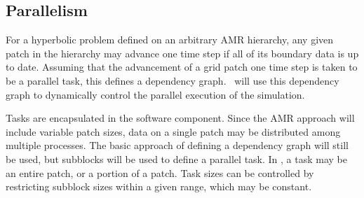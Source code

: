 \documentclass[11pt,letterpaper]{article}
\begin{document}

\subsection{Parallelism} \label{ss:design-parallel}

For a hyperbolic problem defined on an arbitrary AMR hierarchy, any
given patch in the hierarchy may advance one time step if all of its
boundary data is up to date.  Assuming that the advancement of a grid
patch one time step is taken to be a parallel task, this defines a
dependency graph.  \cello\ will use this dependency graph to
dynamically control the parallel execution of the simulation.

%
Tasks are encapsulated in the  software component. Since
the AMR approach will include variable patch sizes, data on a single
patch may be distributed among multiple processes.  The basic approach
of defining a dependency graph will still be used, but subblocks will
be used to define a parallel task.  In \cello, a task may be an entire
patch, or a portion of a patch.  Task sizes can be controlled by
restricting subblock sizes within a given range, which may be
constant.
\end{document}
